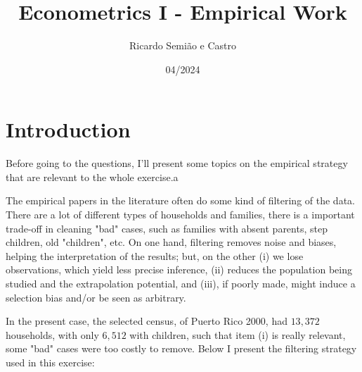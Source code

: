 \documentclass[12pt]{article}
\title{Econometrics I - Empirical Work}
\author{Ricardo Semião e Castro}
\date{04/2024}
\begin{document}
\maketitle

\section{Introduction}

Before going to the questions, I'll present some topics on the empirical strategy that are relevant to the whole exercise.a

The empirical papers in the literature often do some kind of filtering of the data. There are a lot of different types of households and families, there is a important trade-off in cleaning "bad" cases, such as families with absent parents, step children, old "children", etc. On one hand, filtering removes noise and biases, helping the interpretation of the results; but, on the other (i) we lose observations, which yield less precise inference, (ii) reduces the population being studied and the extrapolation potential, and (iii), if poorly made, might induce a selection bias and/or be seen as arbitrary.

In the present case, the selected census, of Puerto Rico 2000, had $13,372$ households, with only $6,512$ with children, such that item (i) is really relevant, some "bad" cases were too costly to remove. Below I present the filtering strategy used in this exercise:
\end{document}
